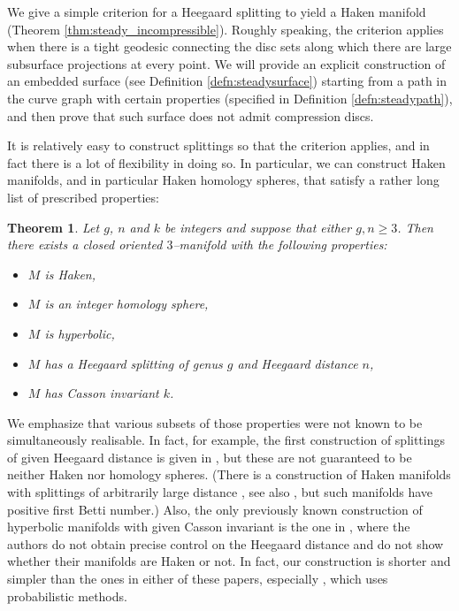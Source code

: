 \documentclass[11pt, oneside]{amsart}
\newtheorem{thm}[lemma]{Theorem}
\theoremstyle{definition}
\theoremstyle{definition}
\begin{document}
 We give a simple criterion for a Heegaard splitting to yield a Haken manifold (Theorem \ref{thm:steady_incompressible}). Roughly speaking, the criterion applies when there is a tight geodesic connecting the disc sets along which there are large subsurface projections at every point. We will provide an explicit construction of an embedded surface (see Definition \ref{defn:steadysurface}) starting from a path in the curve graph with certain properties (specified in Definition \ref{defn:steadypath}), and then prove that such surface does not admit compression discs.
 
 It is relatively easy to construct splittings so that the criterion applies, and in fact there is a lot of flexibility in doing so. In particular, we can construct Haken manifolds, and in particular Haken homology spheres, that satisfy a rather long list of prescribed properties:
 
% 
% 
 \begin{thm}\label{thm:manyhaken}
  Let $g$, $n$ and $k$ be integers and suppose that either $g,n\geq 3$. Then there exists a closed oriented $3$--manifold with the following properties:
  \begin{itemize}
   \item $M$ is Haken,
   \item $M$ is an integer homology sphere,
   \item $M$ is hyperbolic,
   \item $M$ has a Heegaard splitting of genus $g$ and Heegaard distance $n$,
   \item $M$ has Casson invariant $k$.   
  \end{itemize}
 \end{thm}
 
 We emphasize that various subsets of those properties were not known to be simultaneously realisable. In fact, for example, the first construction of splittings of given Heegaard distance is given in \cite{Heegaard_distance_n}, but these are not guaranteed to be neither Haken nor homology spheres. (There is a construction of Haken manifolds with splittings of arbitrarily large distance \cite{Heegaard_distance_at_least_n}, see also \cite{high_distance_knots}, but such manifolds have positive first Betti number.)  Also, the only previously known construction of hyperbolic manifolds with given Casson invariant is the one in \cite{LubotzkyMaherWu}, where the authors do not obtain precise control on the Heegaard distance and do not show whether their manifolds are Haken or not. In fact, our construction is shorter and simpler than the ones in either of these papers, especially \cite{LubotzkyMaherWu}, which uses probabilistic methods.
 
\end{document}
